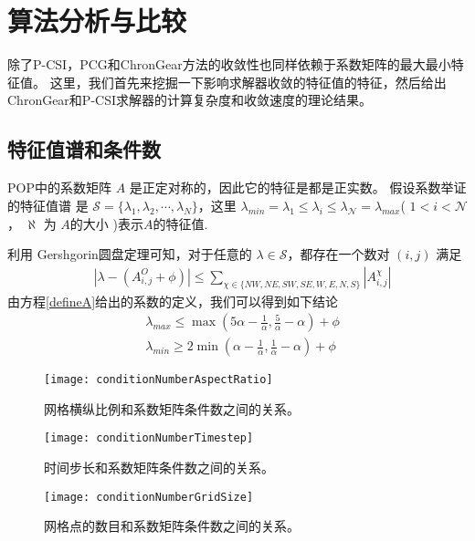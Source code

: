 \section{算法分析与比较}\label{se:Algorithm}
 
除了P-CSI，PCG和ChronGear方法的收敛性也同样依赖于系数矩阵的最大最小特征值。
这里，我们首先来挖掘一下影响求解器收敛的特征值的特征，然后给出ChronGear和P-CSI求解器的计算复杂度和收敛速度的理论结果。 

\subsection{特征值谱和条件数}
POP中的系数矩阵 $A$ 是正定对称的\citep{smith2010parallel}，因此它的特征是都是正实数\citep{stewart1976positive}。
假设系数举证的特征值谱\citep{golub2012matrix} 是 $\mathcal{S} = \{\lambda_1, \lambda_2, \cdots, \lambda_N\}$，这里 $\lambda_{min} = \lambda_1 \le \lambda_i \le \lambda_\mathcal{N} = \lambda_{max}$( $1<i <\mathcal{N}$， $\aleph$ 为 $A$的大小 )表示$A$的特征值.
 
利用 Gershgorin圆盘定理\citep{bell1965gershgorin}可知，对于任意的 $\lambda \in \mathcal{S}$，都存在一个数对 $(i,j)$ 满足
\begin{align}
&|\lambda -  (A_{i,j}^O + \phi ) | \le \sum_{\chi \in \{NW,NE,SW,SE,W,E,N,S\}}|A_{i,j}^\chi|
\end{align}
由方程\ref{defineA}给出的系数的定义，我们可以得到如下结论 
\begin{align} \label{eigsGersh}
&\lambda_{max} \le  \max (  5\alpha - \frac{1}{\alpha}, \frac{5}{\alpha}- \alpha) +\phi   \\
&\lambda_{min} \ge 2\min (  \alpha - \frac{1}{\alpha},\frac{1} {\alpha} -  \alpha) + \phi
\end{align}

\begin {figure}[!htbp]
\centering
\texttt{[image: conditionNumberAspectRatio]}
\caption[] {网格横纵比例和系数矩阵条件数之间的关系。 \label{fig:conditionNumberRatio}}
\end{figure}
\begin {figure}[!htbp]
\centering
\texttt{[image: conditionNumberTimestep]}
\caption[] {时间步长和系数矩阵条件数之间的关系。 \label{fig:conditionNumberDt}}
\end{figure}

\begin {figure}[!htbp]
\centering
\texttt{[image: conditionNumberGridSize]}
\caption[] {网格点的数目和系数矩阵条件数之间的关系。 \label{fig:conditionNumbGrid}}
\end{figure}
 
